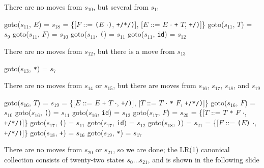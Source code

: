 \documentclass[8pt,a4paper,compress]{beamer}
\newcommand{\mm}[1]{$#1$}
\newcommand{\subs}[2]{${#1}_{#2}$}
\newenvironment{spaced}
{
\smallskip
\hspace{.5cm}
\begin{minipage}[c]{\textwidth}
}
{
\end{minipage}
\smallskip
}
\begin{document}
\begin{frame}[fragile]
\pause

There are no moves from $s_{10}$, but several from $s_{11}$

\text{ }
\begin{spaced}
\begin{production}
goto(\subs{s}{11}, \mm{E}) = \subs{s}{18}
                 = \{[\mm{F}  ::= \lstinline{(}\mm{E} \mm{\cdot}\lstinline{)}, \lstinline{+/*/)}],
                     [\mm{E}  ::= \mm{E} \mm{\cdot} \lstinline{+} \mm{T}, \lstinline{+/)}]\}
goto(\subs{s}{11}, \mm{T}) = \subs{s}{9}
goto(\subs{s}{11}, \mm{F}) = \subs{s}{10}
goto(\subs{s}{11}, \lstinline{(}) = \subs{s}{11}
goto(\subs{s}{11}, \lstinline{id}) = \subs{s}{12}
\end{production}
\end{spaced}

\pause

There are no moves from $s_{12}$, but there is a move from $s_{13}$

\text{ }
\begin{spaced}
\begin{production}
goto(\subs{s}{13}, \lstinline{*}) = \subs{s}{7}
\end{production}
\end{spaced}

\pause

There are no moves from $s_{14}$ or $s_{15}$, but there are moves from $s_{16}$, $s_{17}$, $s_{18}$, and $s_{19}$
\end{frame}

\begin{frame}[fragile]
\pause

\text{ }
\begin{spaced}
\begin{production}
goto(\subs{s}{16}, \mm{T}) = \subs{s}{19}
 		= \{[\mm{E}  ::= \mm{E} \lstinline{+} \mm{T} \mm{\cdot}, \lstinline{+/)}],
                     [\mm{T}  ::= \mm{T} \mm{\cdot} \lstinline{*} \mm{F}, \lstinline{+/*/)}]\}
goto(\subs{s}{16}, \mm{F}) = \subs{s}{10}
goto(\subs{s}{16}, \lstinline{(}) = \subs{s}{11}
goto(\subs{s}{16}, \lstinline{id}) = \subs{s}{12}
goto(\subs{s}{17}, \mm{F}) = \subs{s}{20}
                = \{[\mm{T}  ::= \mm{T} \lstinline{*} \mm{F} \mm{\cdot}, \lstinline{+/*/)}]\}
goto(\subs{s}{17}, \lstinline{(}) = \subs{s}{11}
goto(\subs{s}{17}, \lstinline{id}) = \subs{s}{12}
goto(\subs{s}{18}, \lstinline{)}) = \subs{s}{21}
		= \{[\mm{F}  ::= \lstinline{(}\mm{E}\lstinline{)} \mm{\cdot}, \lstinline{+/*/)}]\}
goto(\subs{s}{18}, \lstinline{+}) = \subs{s}{16}
goto(\subs{s}{19}, \lstinline{*}) = \subs{s}{17}
\end{production}
\end{spaced}

\pause

There are no moves from $s_{20}$ or $s_{21}$, so we are done; the LR(1) canonical collection consists of twenty-two states $s_0 \dots s_{21}$, and is shown in the following slide
\end{frame}
\end{document}
